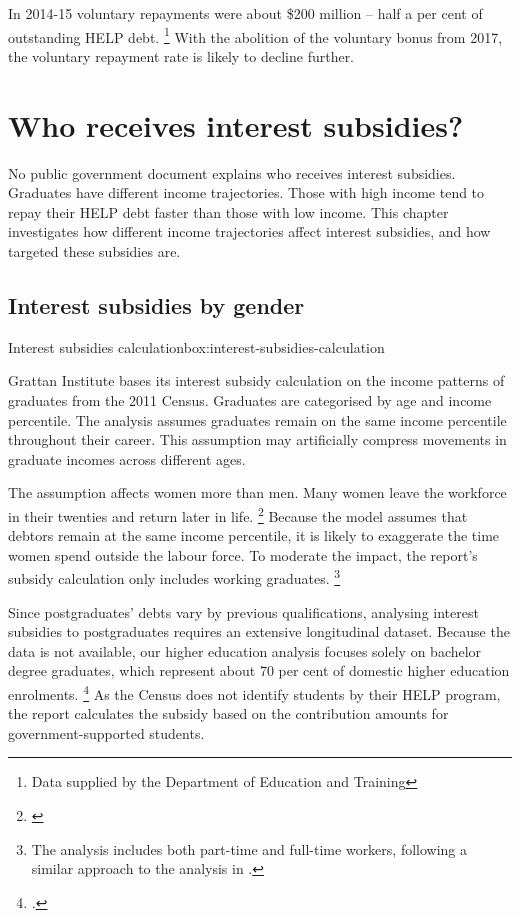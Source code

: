 \documentclass[embargoed]{grattan}
\begin{document}
In 2014-15 voluntary repayments were about \$200 million -- half a per cent of outstanding \gls{HELP} debt.%
\footnote{Data supplied by the Department of Education and Training} With the abolition of the voluntary bonus from 2017, the voluntary repayment rate is likely to decline further.

\chapter{Who receives interest subsidies?}\label{chap:3-who-receives-interest-subsidies}

No public government document explains who receives interest subsidies.
Graduates have different income trajectories.
Those with high income tend to repay their \gls{HELP} debt faster than those with low income.
This chapter investigates how different income trajectories affect interest subsidies, and how targeted these subsidies are.

\section{Interest subsidies by gender}\label{sec:interest-subsidies-by-gender}

\begin{smallbox}{Interest subsidies calculation}{box:interest-subsidies-calculation}
\addtolength{\parskip}{-1pt}

Grattan Institute bases its interest subsidy calculation on the income patterns of graduates from the 2011 Census.
Graduates are categorised by age and income percentile.
The analysis assumes graduates remain on the same income percentile throughout their career.
This assumption may artificially compress movements in graduate incomes across different ages.

The assumption affects women more than men.
Many women leave the workforce in their twenties and return later in life.%
\footnote{\textcite[][figure 9]{Norton2016HELPfuturefairer}} Because the model assumes that debtors remain at the same income percentile, it is likely to exaggerate the time women spend outside the labour force.
To moderate the impact, the report's subsidy calculation only includes working graduates.%
\footnote{The analysis includes both part-time and full-time workers, following a similar approach to the analysis in \textcite[][7--8]{Chapman2014InquiryprovisionsHigher}.
}

Since postgraduates’ debts vary by previous qualifications, analysing interest subsidies to postgraduates requires an extensive longitudinal dataset. Because the data is not available, our higher education analysis focuses solely on bachelor degree graduates, which represent about 70 per cent of domestic higher education enrolments.%
\footnote{\textcite[][Table 2.6]{Education2016StudentsSelectedhigher}.
} 
As the Census does not identify students by their \gls{HELP} program, the report calculates the subsidy based on the contribution amounts for government-supported students. 
\end{smallbox}
\end{document}

